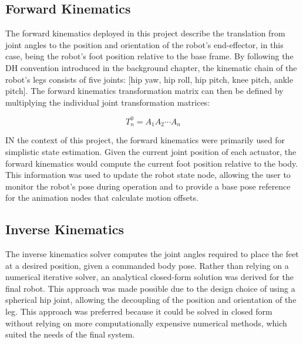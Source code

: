 \subsection{Forward Kinematics}
The forward kinematics deployed in this project describe the translation from joint angles to the position and orientation of the robot's end-effector, in this case, being the robot's foot position relative to the base frame. By following the DH convention introduced in the background chapter, the kinematic chain of the robot's legs consists of five joints: [hip yaw, hip roll, hip pitch, knee pitch, ankle pitch]. The forward kinematics transformation matrix can then be defined by multiplying the individual joint transformation matrices:

\begin{equation}
    T^0_n = A_1 A_2 \cdots A_n
\end{equation}

IN the context of this project, the forward kinematics were primarily used for simplistic state estimation. Given the current joint position of each actuator, the forward kinematics would compute the current foot position relative to the body. This information was used to update the robot state node, allowing the user to monitor the robot's pose during operation and to provide a base pose reference for the animation nodes that calculate motion offsets.
\subsection{Inverse Kinematics}
The inverse kinematics solver computes the joint angles required to place the feet at a desired position, given a commanded body pose. Rather than relying on a numerical iterative solver, an analytical closed-form solution was derived for the final robot. This approach was made possible due to the design choice of using a spherical hip joint, allowing the decoupling of the position and orientation of the leg. This approach was preferred because it could be solved in closed form without relying on more computationally expensive numerical methods, which suited the needs of the final system.

